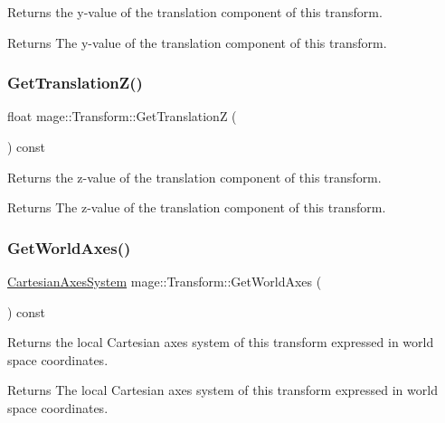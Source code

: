Returns the y-\/value of the translation component of this transform.

\begin{DoxyReturn}{Returns}
The y-\/value of the translation component of this transform. 
\end{DoxyReturn}
\hypertarget{structmage_1_1_transform_a023ce9ea6afaaa80776b4d43957964bf}{}\label{structmage_1_1_transform_a023ce9ea6afaaa80776b4d43957964bf} 
\subsubsection{\texorpdfstring{Get\+Translation\+Z()}{GetTranslationZ()}}
{\footnotesize\ttfamily float mage\+::\+Transform\+::\+Get\+TranslationZ (\begin{DoxyParamCaption}{ }\end{DoxyParamCaption}) const}

Returns the z-\/value of the translation component of this transform.

\begin{DoxyReturn}{Returns}
The z-\/value of the translation component of this transform. 
\end{DoxyReturn}
\hypertarget{structmage_1_1_transform_a580a4f9fd987259da0cf0355ade7fb4b}{}\label{structmage_1_1_transform_a580a4f9fd987259da0cf0355ade7fb4b} 
\subsubsection{\texorpdfstring{Get\+World\+Axes()}{GetWorldAxes()}}
{\footnotesize\ttfamily \hyperlink{structmage_1_1_cartesian_axes_system}{Cartesian\+Axes\+System} mage\+::\+Transform\+::\+Get\+World\+Axes (\begin{DoxyParamCaption}{ }\end{DoxyParamCaption}) const}

Returns the local Cartesian axes system of this transform expressed in world space coordinates.

\begin{DoxyReturn}{Returns}
The local Cartesian axes system of this transform expressed in world space coordinates. 
\end{DoxyReturn}
\hypertarget{structmage_1_1_transform_ac7a718127c5212bb73d04302371473d0}{}\label{structmage_1_1_transform_ac7a718127c5212bb73d04302371473d0} 
